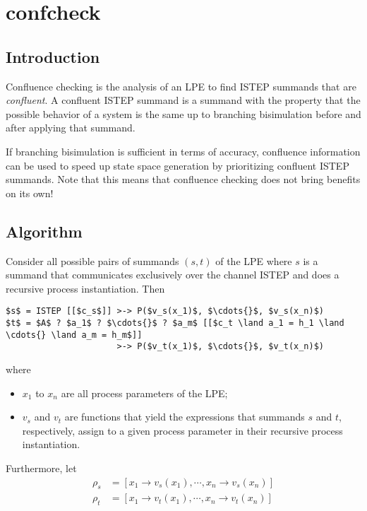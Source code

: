 \chapter{confcheck} \label{confcheck}

\section{Introduction}

Confluence checking is the analysis of an LPE to find ISTEP summands that are \emph{confluent}.
A confluent ISTEP summand is a summand with the property that the possible behavior of a system is the same up to branching bisimulation before and after applying that summand.

If branching bisimulation is sufficient in terms of accuracy, confluence information can be used to speed up state space generation by prioritizing confluent ISTEP summands.
Note that this means that confluence checking does not bring benefits on its own!

\section{Algorithm}

Consider all possible pairs of summands $(s, t)$ of the LPE where $s$ is a summand that communicates exclusively over the channel ISTEP and does a recursive process instantiation.
Then

\begin{lstlisting}[mathescape]
$s$ = ISTEP [[$c_s$]] >-> P($v_s(x_1)$, $\cdots{}$, $v_s(x_n)$)
$t$ = $A$ ? $a_1$ ? $\cdots{}$ ? $a_m$ [[$c_t \land a_1 = h_1 \land \cdots{} \land a_m = h_m$]]
                      >-> P($v_t(x_1)$, $\cdots{}$, $v_t(x_n)$)
\end{lstlisting}

where

\begin{itemize}
\item $x_1$ to $x_n$ are all process parameters of the LPE;
\item $v_s$ and $v_t$ are functions that yield the expressions that summands $s$ and $t$, respectively, assign to a given process parameter in their recursive process instantiation.
\end{itemize}

Furthermore, let
\begin{align*}
\rho_s &= [x_1 \rightarrow v_s(x_1), \cdots{}, x_n \rightarrow v_s(x_n)] \\
\rho_t &= [x_1 \rightarrow v_t(x_1), \cdots{}, x_n \rightarrow v_t(x_n)]
\end{align*}

